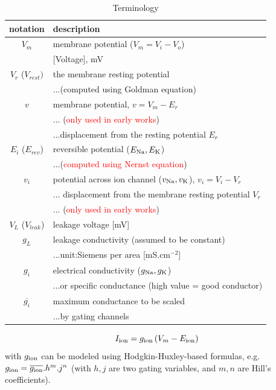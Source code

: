 \begin{table}[!hbt]
  \begin{center}
    \caption{Terminology}
    \begin{tabular}{cp{9cm}}
      \hline
      notation& description \\
      \hline\hline
      $V_m$ & membrane potential ($V_m=V_i-V_o$) \\
      & [Voltage], mV \\
      $V_r$ ($V_{rest})$ & the membrane resting  potential \\ 
      & ...(computed using  Goldman equation)\\
      $v$ & membrane potential, $v=V_m-E_r$ \\
      & ... (\textcolor{red}{only used in early works}) \\
      & ...displacement from the resting   potential $E_r$ \\
      $E_i$ ($E_{rev}$) & reversible potential ($E_{\ce{Na}},
      E_{\ce{K}}$)  \\
      & ...(\textcolor{red}{computed using Nernst equation}) \\
      $v_i$  & potential across ion channel ($v_{\ce{Na}}, v_{\ce{K}}$), $v_i=V_i-V_r$
      \\
      &... displacement from the membrane resting potential $V_r$\\
      & ... (\textcolor{red}{only used in early works}) \\
      $V_L$ ($V_{leak}$) & leakage voltage [mV] \\
      $g_L$ & leakage conductivity (assumed to be constant) \\
            & ...unit:Siemens per area [mS.cm$^{-2}$] \\
      $g_i$ & electrical conductivity ($g_{\ce{Na}}, g_{\ce{K}}$) \\
      & ...or specific conductance (high value = good conductor) \\
      $\overline{g_i}$ & maximum conductance to be scaled \\
      & ...by gating channels \\
    \end{tabular}
  \end{center}
  \label{tab:terminology_1}
\end{table}
\begin{equation}
I_{\text{ion}} = g_{\text{ion}} \left( V_m - E_{\text{ion}} \right)
\end{equation}
with $g_{\text{ion}}$ can be modeled using Hodgkin-Huxley-based formulas, e.g. 
$g_{\text{ion}} = \overline{g_{\text{ion}}}.h^m.j^n$ (with $h,j$ are two gating variables, and
$m,n$ are Hill's coefficients).

